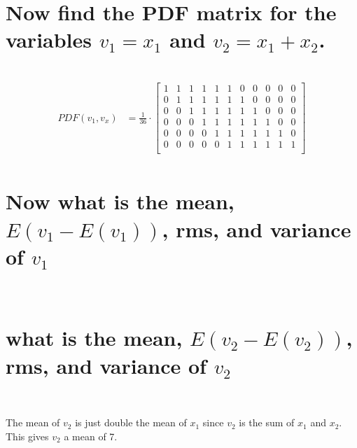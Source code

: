 \documentclass[12pt,letterpaper, onecolumn]{exam}
\begin{document}
\begin{questions}
\begin{parts}
		\part{Now find the PDF matrix for the variables $v_1 = x_1$ and $v_2 = x_1 + x_2$.}\\
		\solution
		\begin{equation}
			\begin{split}
				PDF(v_1,v_x) & = \frac{1}{36}\cdot
				\begin{bmatrix}
					1 & 1 & 1 & 1 & 1 & 1 & 0 & 0 & 0 & 0 & 0 \\
					0 & 1 & 1 & 1 & 1 & 1 & 1 & 0 & 0 & 0 & 0 \\
					0 & 0 & 1 & 1 & 1 & 1 & 1 & 1 & 0 & 0 & 0 \\
					0 & 0 & 0 & 1 & 1 & 1 & 1 & 1 & 1 & 0 & 0 \\
					0 & 0 & 0 & 0 & 1 & 1 & 1 & 1 & 1 & 1 & 0 \\
					0 & 0 & 0 & 0 & 0 & 1 & 1 & 1 & 1 & 1 & 1 \\
				\end{bmatrix}\\
			\end{split}
		\end{equation}
		\part{Now what is the mean, $E(v_1 - E(v_1))$, rms, and variance of $v_1$}\\
		\solution
		\begin{subparts}
		\end{subparts}

		\part{what is the mean, $E(v_2 - E(v_2))$, rms, and variance of $v_2$}\\
		\solution

		The mean of $v_2$ is just double the mean of $x_1$ since $v_2$ is the sum of $x_1$ and $x_2$. This gives $v_2$ a mean of 7.


\end{parts}
\end{questions}
\end{document}
